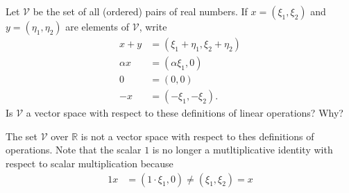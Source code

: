 \documentclass[12pt]{article}
\newcommand{\R}{\mathbb{R}}
\newenvironment{problem}[2][Problem]{\begin{trivlist} \item[\hskip \labelsep {\bfseries #1}\hskip \labelsep {\bfseries #2.}]}{\end{trivlist}}
\newenvironment{solution}[1][Solution]{\begin{trivlist} \item[\hskip \labelsep {\bfseries #1}]}{\end{trivlist}}
\begin{document}
\begin{problem}{3} 
  Let $\mathcal{V}$ be the set of all (ordered) pairs of real numbers. If $x=(\xi_{1},\xi_{2})$ and $y=(\eta_{1},\eta_{2})$ are elements of $\mathcal{V}$, write
\begin{align*}
  x+y &= (\xi_{1}+\eta_{1}, \xi_{2} + \eta_{2})\\
  \alpha x &= (\alpha\xi_{1}, 0)\\
  0 &= (0,0)\\
  -x &= (-\xi_{1},-\xi_{2}).
\end{align*}
Is $\mathcal{V}$ a vector space with respect to these definitions of linear operations? Why?
\begin{solution}
  The set $\mathcal{V}$ over $\R$ is not a vector space with respect to thes definitions of operations. Note that the scalar $1$ is no longer a mutltiplicative identity with respect to scalar multiplication because  
\begin{align*}
  1x &= (1\cdot\xi_{1},0) \neq (\xi_{1},\xi_{2}) = x
\end{align*}
\end{solution}
\end{problem}
\end{document}
